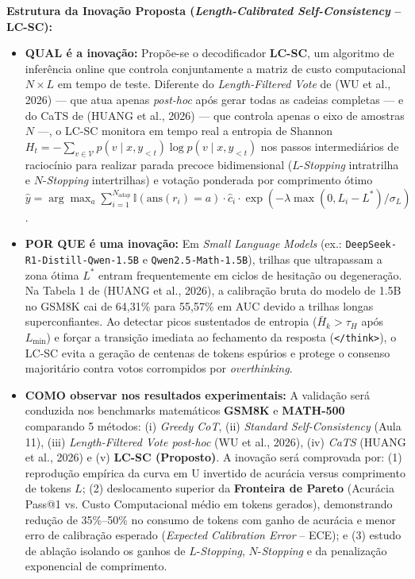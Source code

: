 \documentclass[9pt,a4paper]{extarticle}
\begin{document}
\textbf{Estrutura da Inovação Proposta (\textit{Length-Calibrated Self-Consistency} -- LC-SC):}
\begin{itemize}[leftmargin=1.2em, itemsep=1.2pt, topsep=1pt]
    \item \textbf{QUAL é a inovação:} Propõe-se o decodificador \textbf{LC-SC}, um algoritmo de inferência online que controla conjuntamente a matriz de custo computacional $N \times L$ em tempo de teste. Diferente do \textit{Length-Filtered Vote} de (WU et al., 2026) --- que atua apenas \textit{post-hoc} após gerar todas as cadeias completas --- e do CaTS de (HUANG et al., 2026) --- que controla apenas o eixo de amostras $N$ ---, o LC-SC monitora em tempo real a entropia de Shannon $H_t = -\sum_{v \in \mathcal{V}} p(v \mid x, y_{<t})\log p(v \mid x, y_{<t})$ nos passos intermediários de raciocínio para realizar parada precoce bidimensional ($L$-\textit{Stopping} intratrilha e $N$-\textit{Stopping} intertrilhas) e votação ponderada por comprimento ótimo $\hat{y} = \arg\max_a \sum_{i=1}^{N_{\text{adap}}} \mathbb{I}(\text{ans}(r_i)=a)\cdot \hat{c}_i \cdot \exp(-\lambda \max(0, L_i - L^*)/\sigma_L)$.
    \item \textbf{POR QUE é uma inovação:} Em \textit{Small Language Models} (ex.: \texttt{DeepSeek-R1-Distill-Qwen-1.5B} e \texttt{Qwen2.5-Math-1.5B}), trilhas que ultrapassam a zona ótima $L^*$ entram frequentemente em ciclos de hesitação ou degeneração. Na Tabela 1 de (HUANG et al., 2026), a calibração bruta do modelo de 1.5B no GSM8K cai de 64,31\% para 55,57\% em AUC devido a trilhas longas superconfiantes. Ao detectar picos sustentados de entropia ($\bar{H}_k > \tau_H$ após $L_{\min}$) e forçar a transição imediata ao fechamento da resposta (\texttt{</think>}), o LC-SC evita a geração de centenas de tokens espúrios e protege o consenso majoritário contra votos corrompidos por \textit{overthinking}.
    \item \textbf{COMO observar nos resultados experimentais:} A validação será conduzida nos benchmarks matemáticos \textbf{GSM8K} e \textbf{MATH-500} comparando 5 métodos: (i) \textit{Greedy CoT}, (ii) \textit{Standard Self-Consistency} (Aula 11), (iii) \textit{Length-Filtered Vote post-hoc} (WU et al., 2026), (iv) \textit{CaTS} (HUANG et al., 2026) e (v) \textbf{LC-SC (Proposto)}. A inovação será comprovada por: (1) reprodução empírica da curva em U invertido de acurácia versus comprimento de tokens $L$; (2) deslocamento superior da \textbf{Fronteira de Pareto} (Acurácia Pass@1 vs. Custo Computacional médio em tokens gerados), demonstrando redução de 35\%--50\% no consumo de tokens com ganho de acurácia e menor erro de calibração esperado (\textit{Expected Calibration Error} -- ECE); e (3) estudo de ablação isolando os ganhos de $L$-\textit{Stopping}, $N$-\textit{Stopping} e da penalização exponencial de comprimento.
\end{itemize}
\end{document}
